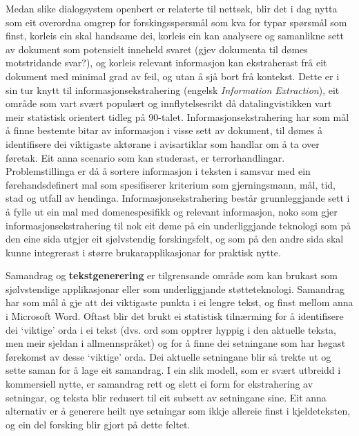 \begin{multicols}{2}
Medan slike dialogsystem openbert er relaterte til nettsøk, blir det i dag nytta som eit overordna omgrep for forskingsspørsmål som kva for typar spørsmål som finst, korleis ein skal handsame dei, korleis ein kan analysere og samanlikne sett av dokument som potensielt inneheld svaret (gjev dokumenta til dømes motstridande svar?), og korleis relevant informasjon kan ekstraherast frå eit dokument med minimal grad av feil, og utan å sjå bort frå kontekst. Dette er i sin tur knytt til informasjonsekstrahering (engelsk \textit{Information Extraction}), eit område som vart svært populært og innflytelsesrikt då datalingvistikken vart meir statistisk orientert tidleg på 90-talet. Informasjonsekstrahering har som mål å finne bestemte bitar av informasjon i visse sett av dokument, til dømes å identifisere dei viktigaste aktørane i avisartiklar som handlar om å ta over føretak. Eit anna scenario som kan studerast, er terrorhandlingar. Problemstillinga er då å sortere informasjon i teksten i samsvar med ein førehandsdefinert mal som spesifiserer kriterium som gjerningsmann, mål, tid, stad og utfall av hendinga. Informasjonsekstrahering består grunnleggjande sett i å fylle ut ein mal med domenespesifikk og relevant informasjon, noko som gjer informasjonsekstrahering til nok eit døme på ein underliggjande teknologi som på den eine sida utgjer eit sjølvstendig forskingsfelt, og som på den andre sida skal kunne integrerast i større brukarapplikasjonar for praktisk nytte.


Samandrag og \textbf{tekstgenerering} er tilgrensande område som kan brukast som sjølvstendige applikasjonar eller som underliggjande støtteteknologi. Samandrag har som mål å gje att dei viktigaste punkta i ei lengre tekst, og finst mellom anna  i Microsoft Word. Oftast blir det brukt ei statistisk tilnærming for å identifisere dei `viktige' orda i ei tekst (dvs. ord som opptrer hyppig i den aktuelle teksta, men meir sjeldan i allmennspråket) og for å finne dei setningane som har høgast førekomst av desse `viktige' orda. Dei aktuelle setningane blir så trekte ut og sette saman for å lage eit samandrag. I ein slik modell, som er svært utbreidd i kommersiell nytte, er samandrag rett og slett ei form for ekstrahering av setningar, og teksta blir redusert til eit subsett av setningane sine. Eit anna alternativ er å generere heilt nye setningar som ikkje allereie finst i kjeldeteksten, og ein del forsking blir gjort på dette feltet.


\end{multicols}
